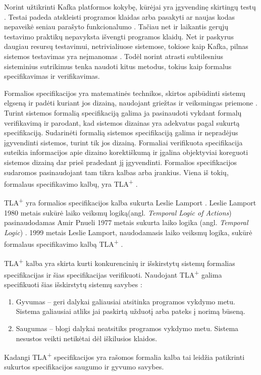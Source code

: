 \documentclass{VUMIFPSmagistrinis}
\begin{document}
		Norint užtikrinti Kafka platformos kokybę, kūrėjai yra įgyvendinę skirtingų testų \cite{kfkGH}.
		Testai padeda atskleisti programos klaidas arba pasakyti ar naujas kodas nepaveikė seniau parašyto funkcionalumo \cite{819971}.
		Tačiau net ir laikantis gerųjų testavimo praktikų nepavyksta išvengti programos klaidų.
		Net ir paskyrus daugiau resursų testavimui, netrivialiuose sistemose, tokiose kaip Kafka, pilnas sistemos testavimas yra neįmanomas \cite{sullivan2004software}.
		Todėl norint atrasti subtilesnius sisteminius sutrikimus tenka naudoti kitus metodus, tokius kaip formalus specifikavimas ir verifikavimas.


		Formalios specifikacijos yra matematinės technikos, skirtos apibūdinti sistemų elgseną ir padėti kuriant jos dizainą, naudojant griežtas ir veiksmingas priemone \cite{holzmann1995improvement}.
		Turint sistemos formalią specifikaciją galima ja pasinaudoti vykdant formalų verifikavimą ir parodant, kad sistemos dizainas yra adekvatus pagal sukurtą specifikaciją.
		Sudarinėti formalią sistemos specifikaciją galima ir nepradėjus įgyvendinti sistemos, turint tik jos dizainą. 
		Formaliai verifikuota specifikacija suteikia informacijos apie dizaino korektiškumą ir įgalina objektyviai koreguoti sistemos dizainą dar prieš pradedant jį įgyvendinti.
		Formalios specifikacijos sudaromos pasinaudojant tam tikra kalbas arba įrankius.
		Viena iš tokių, formalaus specifikavimo kalbų, yra TLA\textsuperscript{+} \cite{lamport2002specifying}.
		

		TLA\textsuperscript{+} yra formalios specifikacijos kalba sukurta Leslie Lamport \cite{lamport2002specifying}.
		Leslie Lamport 1980 metais sukūrė laiko veiksmų logiką(angl. {\it Temporal Logic of Actions}) \cite{10.1145/177492.177726} pasinaudodamas Amir Pnueli 1977 metais sukurta laiko logika (angl. {\it Temporal Logic}) \cite{4567924}.
		1999 metais Leslie Lamport, naudodamasis laiko veiksmų logika, sukūrė formalaus specifikavimo kalbą TLA\textsuperscript{+} \cite{lamport2002specifying}.
		

TLA\textsuperscript{+} kalba yra skirta kurti konkurencinių ir išskirstytų sistemų formalias specifikacijas ir šias specifikacijas verifikuoti.
		Naudojant TLA\textsuperscript{+} galima specifikuoti šias išskirstytų sistemų savybes \cite{1702415} :
		\begin{enumerate}
			\item{Gyvumas -- geri dalykai galiausiai atsitinka programos vykdymo metu. Sistema galiausiai atliks jai paskirtą užduotį arba pateks į norimą būseną.}
			\item{Saugumas -- blogi dalykai neatsitiks programos vykdymo metu. Sistema nesustos veikti netikėtai dėl iškilusios klaidos.}
		\end{enumerate}
		Kadangi TLA\textsuperscript{+} specifikacijos yra rašomos formalia kalba tai leidžia patikrinti sukurtos specifikacijos saugumo ir gyvumo savybes.
		
\end{document}
